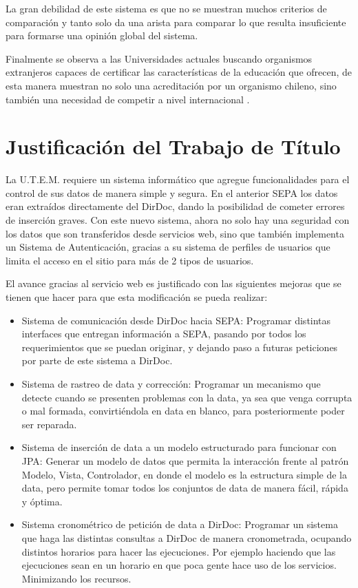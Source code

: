 \documentclass[a4paper,12pt,openany,oneside]{book}
\begin{document}
La gran debilidad de este sistema es que no se muestran muchos criterios de comparación y tanto solo da una arista para comparar lo que resulta insuficiente para formarse una opinión global del sistema.

Finalmente se observa a las Universidades actuales buscando organismos extranjeros capaces de certificar las características de la educación que ofrecen, de esta manera muestran no solo una acreditación por un organismo chileno, sino también una necesidad de competir a nivel internacional \cite{data3}.

\section{Justificación del Trabajo de Título}
La U.T.E.M. requiere un sistema informático que agregue funcionalidades para el control de sus datos de manera simple y segura. En el anterior SEPA los datos eran extraídos directamente del DirDoc, dando la posibilidad de cometer errores de inserción graves. Con este nuevo sistema, ahora no solo hay una seguridad con los datos que son transferidos desde servicios web, sino que también implementa un Sistema de Autenticación, gracias a su sistema de perfiles de usuarios que limita el acceso en el sitio para más de 2 tipos de usuarios.

El avance gracias al servicio web es justificado con las siguientes mejoras que se tienen que hacer para que esta modificación se pueda realizar:

\begin{itemize}
	\item Sistema de comunicación desde DirDoc hacia SEPA: Programar distintas interfaces que entregan información a SEPA, pasando por todos los requerimientos que se puedan originar, y dejando paso a futuras peticiones por parte de este sistema a DirDoc.
	\item Sistema de rastreo de data y corrección: Programar un mecanismo que detecte cuando se presenten problemas con la data, ya sea que venga corrupta o mal formada, convirtiéndola en data en blanco, para posteriormente poder ser reparada.
	\item Sistema de inserción de data a un modelo estructurado para funcionar con JPA: Generar un modelo de datos que permita la interacción frente al patrón Modelo, Vista, Controlador, en donde el modelo es la estructura simple de la data, pero permite tomar todos los conjuntos de data de manera fácil, rápida y óptima.
	\item Sistema cronométrico de petición de data a DirDoc: Programar un sistema que haga las distintas consultas a DirDoc de manera cronometrada, ocupando distintos horarios para hacer las ejecuciones. Por ejemplo haciendo que las ejecuciones sean en un horario en que poca gente hace uso de los servicios. Minimizando los recursos.
\end{itemize}
\end{document}
